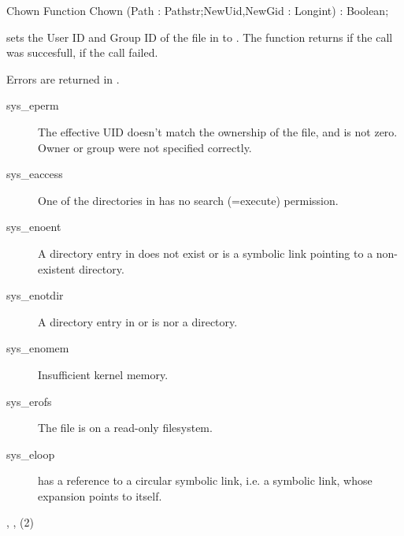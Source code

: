 \begin{function}{Chown}
\Declaration
Function Chown (Path : Pathstr;NewUid,NewGid : Longint) : Boolean;

\Description
  sets the User ID and Group ID of the file in  to .
The function returns  if the call was succesfull,  if the call
failed.

\Errors

Errors are returned in .
\begin{description}
\item[sys\_eperm] The effective UID doesn't match the ownership of the file,
and is not zero. Owner or group were not specified correctly.
\item[sys\_eaccess] One of the directories in  has no
search (=execute) permission.
\item[sys\_enoent] A directory entry in  does
not exist or is a symbolic link pointing to a non-existent directory.
\item[sys\_enotdir] A directory entry in  or  is
nor a directory.
\item[sys\_enomem] Insufficient kernel memory.
\item[sys\_erofs] The file is on a read-only filesystem.
\item[sys\_eloop]  has a reference to a circular
symbolic link, i.e. a symbolic link, whose expansion points to itself.
\end{description}

\SeeAlso
{}, , (2)
\end{function}
\latex{}
\html{}
